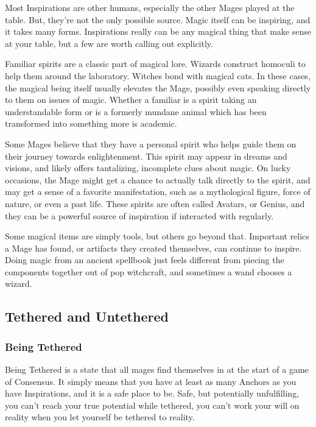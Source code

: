 \documentclass[
]{article}
\begin{document}
Most Inspirations are other humans, especially the other Mages played at
the table. But, they're not the only possible source. Magic itself can
be inspiring, and it takes many forms. Inspirations really can be any
magical thing that make sense at your table, but a few are worth calling
out explicitly.

Familiar spirits are a classic part of magical lore. Wizards construct
homoculi to help them around the laboratory. Witches bond with magical
cats. In these cases, the magical being itself usually elevates the
Mage, possibly even speaking directly to them on issues of magic.
Whether a familiar is a spirit taking an understandable form or is a
formerly mundane animal which has been transformed into something more
is academic.

Some Mages believe that they have a personal spirit who helps guide them
on their journey towards enlightenment. This spirit may appear in dreams
and visions, and likely offers tantalizing, incomplete clues about
magic. On lucky occasions, the Mage might get a chance to actually talk
directly to the spirit, and may get a sense of a favorite manifestation,
such as a mythological figure, force of nature, or even a past life.
These spirits are often called Avatars, or Genius, and they can be a
powerful source of inspiration if interacted with regularly.

Some magical items are simply tools, but others go beyond that.
Important relics a Mage has found, or artifacts they created themselves,
can continue to inspire. Doing magic from an ancient spellbook just
feels different from piecing the components together out of pop
witchcraft, and sometimes a wand chooses a wizard.

\hypertarget{tethered-and-untethered}{%
\subsection{Tethered and Untethered}\label{tethered-and-untethered}}

\hypertarget{being-tethered}{%
\subsubsection{Being Tethered}\label{being-tethered}}

Being Tethered is a state that all mages find themselves in at the start
of a game of Consensus. It simply means that you have at least as many
Anchors as you have Inspirations, and it is a safe place to be. Safe,
but potentially unfulfilling, you can't reach your true potential while
tethered, you can't work your will on reality when you let yourself be
tethered to reality.
\end{document}
